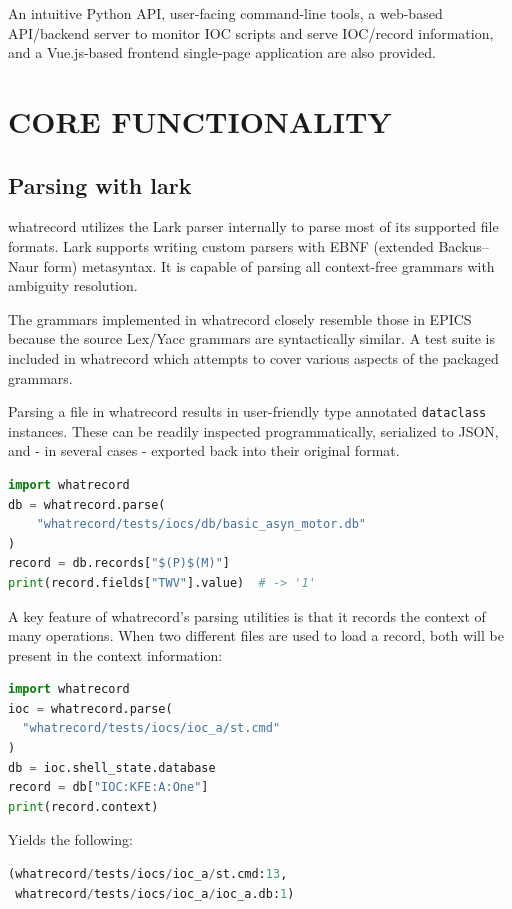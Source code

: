 \documentclass[letter,
               keeplastbox,   %
               ]{jacow}
\begin{document}
An intuitive Python API, user-facing command-line tools, a web-based
API/backend server to monitor IOC scripts and serve IOC/record information, and
a Vue.js-based frontend single-page application are also provided.

\section{CORE FUNCTIONALITY}

\subsection{Parsing with lark}

whatrecord utilizes the Lark\cite{lark} parser internally to parse most of its supported
file formats.  Lark supports writing custom parsers with EBNF (extended
Backus–Naur form) metasyntax.  It is capable of parsing all context-free
grammars with ambiguity resolution. 

The grammars implemented in whatrecord closely resemble those in EPICS because
the source Lex/Yacc grammars are syntactically similar.  A test suite is
included in whatrecord which attempts to cover various aspects of the packaged
grammars.

Parsing a file in whatrecord results in user-friendly type annotated
\verb_dataclass_ instances. These can be readily inspected programmatically,
serialized to JSON, and - in several cases - exported back into their original
format.

\begin{lstlisting}[language=python]
import whatrecord
db = whatrecord.parse(
    "whatrecord/tests/iocs/db/basic_asyn_motor.db"
)
record = db.records["$(P)$(M)"]
print(record.fields["TWV"].value)  # -> '1'
\end{lstlisting}

A key feature of whatrecord's parsing utilities is that it records the context
of many operations.  When two different files are used to load a record,
both will be present in the context information:

\begin{lstlisting}[language=python]
import whatrecord
ioc = whatrecord.parse(
  "whatrecord/tests/iocs/ioc_a/st.cmd"
)
db = ioc.shell_state.database
record = db["IOC:KFE:A:One"]
print(record.context)
\end{lstlisting}

Yields the following:
\begin{lstlisting}[language=python]
(whatrecord/tests/iocs/ioc_a/st.cmd:13,
 whatrecord/tests/iocs/ioc_a/ioc_a.db:1)
\end{lstlisting}
\end{document}
